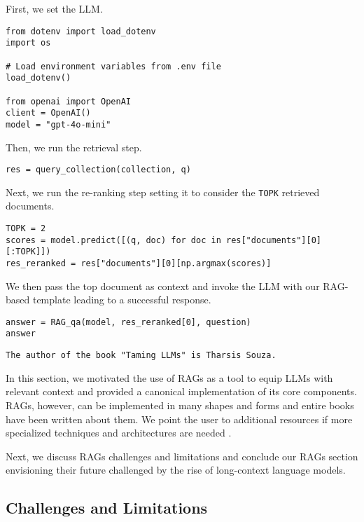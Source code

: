 First, we set the LLM.

\begin{verbatim}
from dotenv import load_dotenv
import os

# Load environment variables from .env file
load_dotenv()

from openai import OpenAI
client = OpenAI()
model = "gpt-4o-mini"
\end{verbatim}

Then, we run the retrieval step.

\begin{verbatim}
res = query_collection(collection, q)
\end{verbatim}

Next, we run the re-ranking step setting it to consider the \texttt{TOPK} retrieved documents.

\begin{verbatim}
TOPK = 2
scores = model.predict([(q, doc) for doc in res["documents"][0][:TOPK]])
res_reranked = res["documents"][0][np.argmax(scores)]
\end{verbatim}

We then pass the top document as context and invoke the LLM with our RAG-based template leading to a successful response.

\begin{verbatim}
answer = RAG_qa(model, res_reranked[0], question)
answer
\end{verbatim}

\begin{verbatim}
The author of the book "Taming LLMs" is Tharsis Souza.
\end{verbatim}
In this section, we motivated the use of RAGs as a tool to equip LLMs with relevant context and provided a canonical implementation of its core components. RAGs, however, can be implemented in many shapes and forms and entire books have been written about them. We point the user to additional resources if more specialized techniques and architectures are needed .

Next, we discuss RAGs challenges and limitations and conclude our RAGs section envisioning their future challenged by the rise of long-context language models.


\subsection{Challenges and Limitations}


